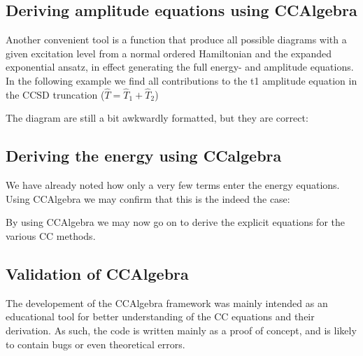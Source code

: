 \begin{minipage}{\linewidth}
\end{minipage}

\subsection{Deriving amplitude equations using CCAlgebra}

Another convenient tool is a function that produce all possible diagrams with a given excitation level from a normal ordered Hamiltonian and the expanded exponential ansatz, in effect generating the full energy- and amplitude equations. In the following example we find all contributions to the t1 amplitude equation in the CCSD truncation ($\hat{T} = \hat{T}_1 + \hat{T}_2$)

\begin{minipage}{\linewidth}
\end{minipage}

The diagram are still a bit awkwardly formatted, but they are correct:

\begin{minipage}{\linewidth}
\end{minipage}

\subsection{Deriving the energy using CCalgebra}

We have already noted how only a very few terms enter the energy equations. Using CCAlgebra we may confirm that this is the indeed the case:

\begin{minipage}{\linewidth}
\end{minipage}

By using CCAlgebra we may now go on to derive the explicit equations for the various CC methods. 

\subsection{Validation of CCAlgebra}

The developement of the CCAlgebra framework was mainly intended as an educational tool for better understanding of the CC equations and their derivation. As such, the code is written mainly as a proof of concept, and is likely to contain bugs or even theoretical errors. 

